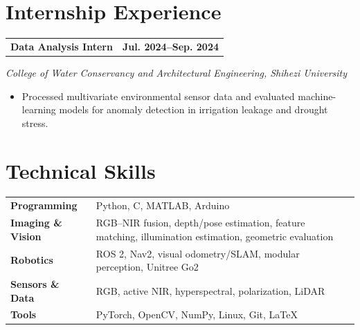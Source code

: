 \documentclass[11pt,letterpaper]{article}
\makeatletter
\newcommand{\datefont}[1]{{\fontsize{9.6}{13.5}\selectfont\bfseries\leavevmode\color{dateblue}#1}}
\newcommand{\entryheader}[2]{%
  \noindent\begin{tabularx}{\linewidth}{@{}X>{\raggedleft\arraybackslash}p{1.50in}@{}}
    {\fontsize{11}{14}\selectfont\bfseries #1} & \datefont{#2}
  \end{tabularx}\par
}
\newcommand{\researchentry}[3]{%
  \Needspace{5\baselineskip}%
  \entryheader{#1}{#2}%
  \vspace{2pt}%
  {\fontsize{10}{13}\selectfont\itshape #3\par}%
}
\newcommand{\tightbullets}{%
  \begin{itemize}[leftmargin=1.15em,labelsep=0.40em,itemsep=2pt,topsep=3pt,parsep=0pt,partopsep=0pt]
}
\newcommand{\tightbulletsend}{\end{itemize}}
\makeatother
\begin{document}
\section{Internship Experience}

\researchentry
  {Data Analysis Intern}
  {Jul. 2024--Sep. 2024}
  {College of Water Conservancy and Architectural Engineering, Shihezi University}
\tightbullets
  \item Processed multivariate environmental sensor data and evaluated machine-learning models for anomaly detection in irrigation leakage and drought stress.
\tightbulletsend

\section{Technical Skills}
{\fontsize{11}{14.3}\selectfont
\renewcommand{\arraystretch}{1.06}
\begin{tabularx}{\textwidth}{@{}>{\bfseries}p{1.40in}>{\raggedright\arraybackslash}X@{}}
Programming & Python, C, MATLAB, Arduino \\
Imaging \& Vision & RGB--NIR fusion, depth/pose estimation, feature matching, illumination estimation, geometric evaluation \\
Robotics & ROS 2, Nav2, visual odometry/SLAM, modular perception, Unitree Go2 \\
Sensors \& Data & RGB, active NIR, hyperspectral, polarization, LiDAR \\
Tools & PyTorch, OpenCV, NumPy, Linux, Git, LaTeX
\end{tabularx}\par}
\end{document}
